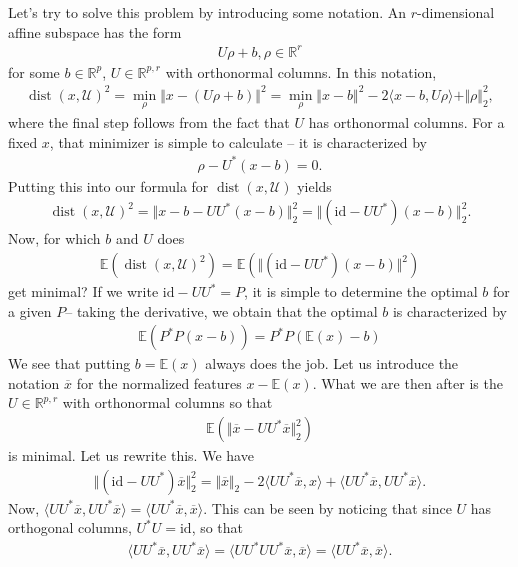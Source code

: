 \documentclass{article}
\newcommand{\erw}{\mathbb{E}} %
\newcommand{\id}{\mathrm{id}}
\newcommand{\sprod}[1]{\langle #1 \rangle}
\newcommand{\calU}{\mathcal{U}}
\newcommand{\R}{\mathbb{R}}
\newcommand{\norm}[1]{\Vert #1 \Vert}
\DeclareMathOperator{\dist}{dist}
\begin{document}
Let's try to solve this problem by introducing some notation. An $r$-dimensional affine subspace has the form
\begin{align*}
    U\rho + b, \rho\in \R^r 
\end{align*}
for some $b\in\R^p$, $U\in \R^{p,r}$ with orthonormal columns. In this notation,
\begin{align*}
    \dist(x,\calU)^2 = \min_\rho \norm{x-(U\rho+b)}^2 =  \min_\rho \norm{x-b}^2 - 2\sprod{x-b,U\rho} + \norm{\rho}_2^2,
\end{align*}
where the final step follows from the fact that $U$ has orthonormal columns.
For a fixed $x$, that  minimizer is simple to calculate -- it is characterized by
\begin{align} \label{eq:scores}
    \rho-U^*(x-b)=0.
\end{align}
Putting this into our formula for $\dist(x,\calU)$ yields
\begin{align*}
   \dist(x,\calU)^2 = \norm{x-b -UU^*(x-b)}_2^2 = \norm{(\id-UU^*)(x-b)}_2^2. 
\end{align*}
Now, for which $b$ and $U$ does
\begin{align*}
    \mathbb{E}(\dist(x,\calU)^2) = \mathbb{E}(\norm{(\id-UU^*)(x-b)}^2)
\end{align*}
get minimal? If we write $\id-UU^*=P$, it is simple to determine the optimal $b$ for a given $P$-- taking the derivative, we obtain that the optimal $b$ is characterized by
\begin{align*}
    \mathbb{E}(P^*P(x-b))=P^*P(\mathbb{E}(x)-b)
\end{align*}
We see that putting $b = \mathbb{E}(x)$ always does the job. Let us introduce the notation $\overline{x}$ for the normalized features $x- \mathbb{E}(x)$. What we are then after is the $U\in \R^{p,r}$ with orthonormal columns so that 
\begin{align*}
    \erw( \norm{\overline{x}-UU^*\overline{x}}_2^2)
\end{align*}
is minimal. Let us rewrite this. We have
\begin{align*}
    \norm{(\id-UU^*)\overline{x}}_2^2 = \norm{\overline{x}}_2-2\sprod{UU^*\overline{x},x} + \sprod{UU^*\overline{x},UU^*\overline{x}}.
\end{align*}
Now, $\sprod{UU^*\overline{x},UU^*\overline{x}} = \sprod{UU^*\overline{x},\overline{x}}$. This can be seen by noticing that since $U$ has orthogonal columns, $U^*U=\id$, so that
\begin{align*}
\sprod{UU^*\overline{x},UU^*\overline{x}} = \sprod{UU^*UU^*\overline{x},\overline{x}} = \sprod{UU^*\overline{x},\overline{x}}.
\end{align*}
\end{document}
